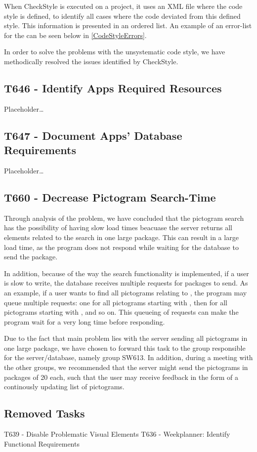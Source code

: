 When CheckStyle is executed on a project, it uses an XML file where the code
style is defined, to identify all cases where the code deviated from this
defined style. This information is presented in an ordered list. An example of
an error-list for the  can be seen below in
\autoref{CodeStyleErrors}.


In order to solve the problems with the unsystematic code style, we have
methodically resolved the issues identified by CheckStyle.

\subsection{T646 - Identify Apps Required Resources}
Placeholder\ldots

\subsection{T647 - Document Apps' Database Requirements}
Placeholder\ldots

\subsection{T660 - Decrease Pictogram Search-Time}
Through analysis of the problem, we have concluded that the pictogram search has
the possibility of having slow load times beacuase the server returns all
elements related to the search in one large package. This can result in a large
load time, as the program does not respond while waiting for the database to
send the package. \nl

In addition, because of the way the search functionality is
implemented, if a user is slow to write, the database receives multiple requests
for packages to send. As an example, if a user wants to find all pictograms
relating to , the program may queue multiple requests: one for
all pictograms starting with , then for all pictograms starting with
, and so on. This queueing of requests can make the program wait for a
very long time before responding.\nl

Due to the fact that main problem lies with the server sending all pictograms in
one large package, we have chosen to forward this task to the group responsible
for the server/database, namely group SW613. In addition, during a meeting with
the other groups, we recommended that the server might send the pictograms in
packages of 20 each, such that the user may receive feedback in the form of a
continously updating list of pictograms.
 
\subsection{Removed Tasks}
T639 - Disable Problematic Visual Elements\nl
T636 - Weekplanner: Identify Functional Requirements\nl

